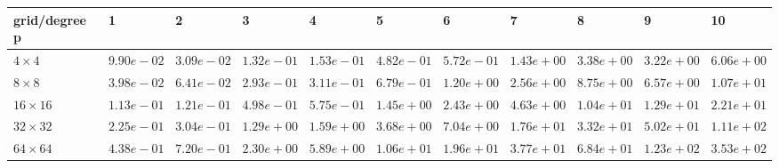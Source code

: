 \begin{tabular}{lllllllllll}
\hline
 grid/degree p   & 1          & 2          & 3          & 4          & 5          & 6          & 7          & 8          & 9          & 10         \\
\hline
 $4 \times 4$    & $9.90e-02$ & $3.09e-02$ & $1.32e-01$ & $1.53e-01$ & $4.82e-01$ & $5.72e-01$ & $1.43e+00$ & $3.38e+00$ & $3.22e+00$ & $6.06e+00$ \\
 $8 \times 8$    & $3.98e-02$ & $6.41e-02$ & $2.93e-01$ & $3.11e-01$ & $6.79e-01$ & $1.20e+00$ & $2.56e+00$ & $8.75e+00$ & $6.57e+00$ & $1.07e+01$ \\
 $16 \times 16$  & $1.13e-01$ & $1.21e-01$ & $4.98e-01$ & $5.75e-01$ & $1.45e+00$ & $2.43e+00$ & $4.63e+00$ & $1.04e+01$ & $1.29e+01$ & $2.21e+01$ \\
 $32 \times 32$  & $2.25e-01$ & $3.04e-01$ & $1.29e+00$ & $1.59e+00$ & $3.68e+00$ & $7.04e+00$ & $1.76e+01$ & $3.32e+01$ & $5.02e+01$ & $1.11e+02$ \\
 $64 \times 64$  & $4.38e-01$ & $7.20e-01$ & $2.30e+00$ & $5.89e+00$ & $1.06e+01$ & $1.96e+01$ & $3.77e+01$ & $6.84e+01$ & $1.23e+02$ & $3.53e+02$ \\
\hline
\end{tabular}